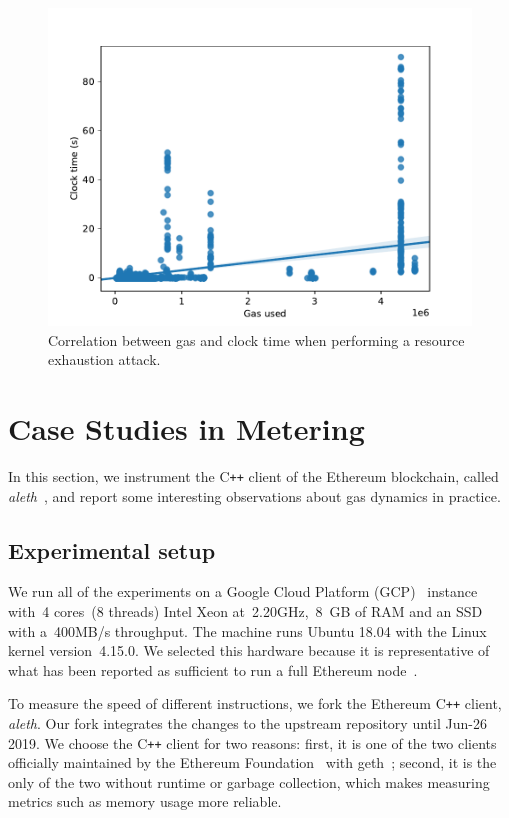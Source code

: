 \begin{figure}[tb]
  \centering\includegraphics[width=\textwidth]{3-vm-security/figures/cpu-gas-extcodesize.pdf}
  \caption{Correlation between gas and clock time when performing a resource exhaustion attack.}
  \label{fig:extcodesize-cpu}
\end{figure}

\section{Case Studies in Metering}
\label{sec:3:case-studies}

In this section, we instrument the C\texttt{++} client of the Ethereum blockchain, called \textit{aleth}~\cite{aleth}, and report some interesting observations about gas dynamics in practice.

\subsection{Experimental setup}
 We run all of the experiments on a Google Cloud Platform (GCP)~\cite{gcp-compute-engine} instance with~4 cores~(8 threads) Intel Xeon at~2.20GHz,~8~GB of RAM and an SSD with a~400MB/s throughput.
The machine runs Ubuntu 18.04 with the Linux kernel version~4.15.0. We selected this hardware because it is representative of what has been reported as sufficient to run a full Ethereum node~\cite{node-incentive,pantheon-system-requirements,eth-hardware-requirements}.

 To measure the speed of different instructions, we fork the Ethereum C\texttt{++} client, \textit{aleth}.
Our fork integrates the changes to the upstream repository until Jun-26 2019.
We choose the C\texttt{++} client for two reasons: first, it is one of the two clients officially maintained by the Ethereum Foundation~\cite{ethereum-foundation-github} with geth~\cite{geth}; second, it is the only of the two without runtime or garbage collection, which makes measuring metrics such as memory usage more reliable.

